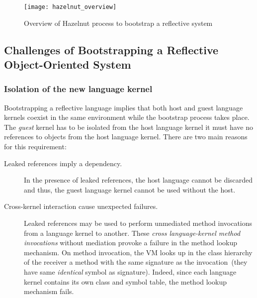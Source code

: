 \begin{figure}[!ht]
\begin{center}
\texttt{[image: hazelnut\_overview]}
\caption{Overview of Hazelnut process to bootstrap a reflective system\label{fig:hazelnut_overview}}
\end{center}
\end{figure}

\subsection{Challenges of Bootstrapping a Reflective Object-Oriented System}


\subsubsection{Isolation of the new language kernel} Bootstrapping a reflective language implies that both host and guest language kernels coexist in the same environment while the bootstrap process takes place. The \emph{guest} kernel has to be isolated from the host language kernel \ie it must have no references to objects from the host language kernel. There are two main reasons for this requirement:

\begin{description}
\item[Leaked references imply a dependency.] In the presence of leaked references, the host language cannot be discarded and thus, the guest language kernel cannot be used without the host.
\item[Cross-kernel interaction cause unexpected failures.] Leaked references may be used to perform unmediated method invocations from a language kernel to another. These \emph{cross language-kernel method invocations} without mediation provoke a failure in the method lookup mechanism. On method invocation, the VM looks up in the class hierarchy of the receiver a method with the same signature as the invocation~(\ie they have same \emph{identical} symbol as signature). Indeed, since each language kernel contains its own  class and symbol table, the method lookup mechanism fails.


\end{description}

